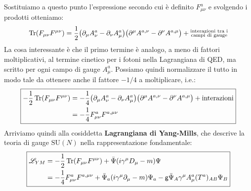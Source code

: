 \documentclass[../main.tex]{subfiles}
\begin{document}
Sostituiamo a questo punto l'espressione secondo cui è definito $F_{\mu\nu}^a$ e svolgendo i prodotti otteniamo:
\[
\Tr(F_{\mu\nu}F^{\mu\nu}) = \frac{1}{2}\big(\partial_\mu A_\nu^a - \partial_\nu A_\mu^a\big)\big(\partial^\mu A^{a,\nu} - \partial^\nu A^{a,\mu}\big) + \substack{\text{interazioni tra i}\\\text{campi di gauge}}
\]
La cosa interessante è che il primo termine è analogo, a meno di fattori moltiplicativi, al termine cinetico per i fotoni nella Lagrangiana di QED, ma scritto per ogni campo di gauge $A_\mu^a$. Possiamo quindi normalizzare il tutto in modo tale da ottenere anche il fattore $-1/4$ a moltiplicare, i.e.:
\[
\boxed{
\begin{aligned}
    -\frac{1}{2}\Tr(F_{\mu\nu}F^{\mu\nu}) &= -\frac{1}{4}\big(\partial_\mu A_\nu^a - \partial_\nu A_\mu^a\big)\big(\partial^\mu A^{a,\nu} - \partial^\nu A^{a,\mu}\big) + \text{interazioni} \\
    &=-\frac{1}{4}F_{\mu\nu}^aF^{a,\mu\nu}
\end{aligned}}
\]
Arriviamo quindi alla cosiddetta \textbf{Lagrangiana di Yang-Mills}, che descrive la teoria di gauge $\textrm{SU}(N)$ nella rappresentazione fondamentale:
\begin{equation}
    \boxed{\begin{aligned}
        \mathscr{L}_{YM} &= -\frac{1}{2}\Tr(F_{\mu\nu}F^{\mu\nu}) + \bar\Psi(i\gamma^\mu D_\mu - m)\Psi \\
        &=-\frac{1}{4}F_{\mu\nu}^aF^{a,\mu\nu} + \bar\Psi_a(i\gamma^\mu \partial_\mu - m)\Psi_a - \mathsf{g}\bar\Psi_A\gamma^\mu A_\mu^a (T^a)_{AB}\Psi_B
    \end{aligned}}
    \label{eq:SUN_yangmills_lagrangian}
\end{equation}
\end{document}
